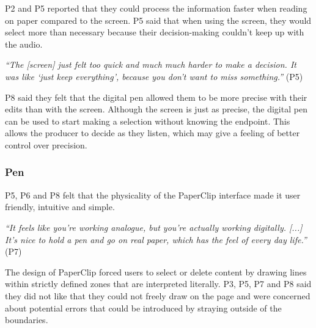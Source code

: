 

P2 and P5 reported that they could process the information faster when reading on paper compared to the screen. P5 said
that when using the screen, they would select more than necessary because their decision-making couldn't keep up with
the audio.


\textit{``The [screen] just felt too quick and much much harder to make a decision. It was like
  `just keep everything', because you don't want to miss something.''} (P5)

P8 said they felt that the digital pen allowed them to be more precise with their edits than with the screen.  Although
the screen is just as precise, the digital pen can be used to start making a selection without knowing the endpoint.
This allows the producer to decide as they listen, which may give a feeling of better control over precision.



\subsubsection{Pen}

P5, P6 and P8 felt that the physicality of the PaperClip interface made it user friendly, intuitive and simple.

\textit{``It feels like you're working analogue, but you're actually working digitally. [...] It's nice to hold a pen
and go on real paper, which has the feel of every day life.''} (P7)

The design of PaperClip forced users to select or delete content by drawing lines within strictly defined zones
that are interpreted literally. P3, P5, P7 and P8 said they did not like that they could not freely draw on the page and were
concerned about potential errors that could be introduced by straying outside of the boundaries.

